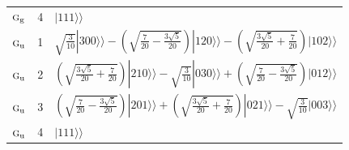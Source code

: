 \documentclass[11pt]{article}
\newcommand{\irr}[1]{\text{\normalfont\scshape #1}}
\newcommand{\ptag}[1]{\mathrm{#1}}
\newcommand{\kett}[1]{|#1\rangle\!\rangle}
\begin{document}
\begin{longtable}{l c p{}}
$\irr{g}_{\ptag{g}}$ & 4 & $\kett{111}$\\

$\irr{g}_{\ptag{u}}$ & 1 & $\sqrt{\tfrac{3}{10}}\kett{300}-(\sqrt{\frac{7}{20} - \frac{3 \sqrt{5}}{20}})\kett{120}-(\sqrt{\frac{3 \sqrt{5}}{20} + \frac{7}{20}})\kett{102}$\\

$\irr{g}_{\ptag{u}}$ & 2 & $(\sqrt{\frac{3 \sqrt{5}}{20} + \frac{7}{20}})\kett{210}-\sqrt{\tfrac{3}{10}}\kett{030}+(\sqrt{\frac{7}{20} - \frac{3 \sqrt{5}}{20}})\kett{012}$\\

$\irr{g}_{\ptag{u}}$ & 3 & $(\sqrt{\frac{7}{20} - \frac{3 \sqrt{5}}{20}})\kett{201}+(\sqrt{\frac{3 \sqrt{5}}{20} + \frac{7}{20}})\kett{021}-\sqrt{\tfrac{3}{10}}\kett{003}$\\

$\irr{g}_{\ptag{u}}$ & 4 & $\kett{111}$\\

\hline\end{longtable}
\end{document}

